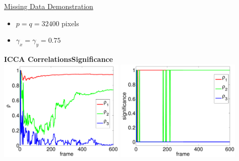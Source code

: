 \documentclass[8pt]{beamer}
\begin{document}
\begin{frame}{\href{run:/home/user/Documents/thesis_vids/youtube_missing.mp4}{Missing Data
      Demonstration}}

  \begin{itemize}
  \item $p=q=32400$ pixels
  \item $\gamma_x=\gamma_y=0.75$
  \end{itemize}

  \vspace{3ex}

  \begin{center}
    \textbf{ICCA Correlations}\hspace{23ex}\textbf{Significance}\\[0.5ex]
    \includegraphics[width=0.45\textwidth]{figures/icca_corrs_miss.pdf}\hspace{2ex}
    \includegraphics[width=0.45\textwidth]{figures/icca_sigs_miss.pdf}\\[2ex]
  \end{center}

\end{frame}
\end{document}
